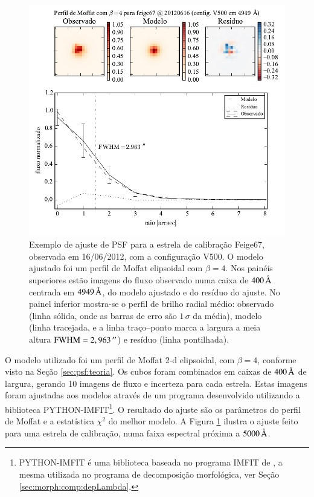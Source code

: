 \begin{figure}
	\includegraphics{figuras/PSFMoffatBeta4_exemplo}
	\caption[Exemplo de ajuste de PSF para estrela de calibração.]
	{Exemplo de ajuste de PSF para a estrela de calibração Feige67, observada em
	16/06/2012, com a configuração V500. O modelo ajustado foi um perfil de
	Moffat elipsoidal com $\beta=4$. Nos painéis superiores estão imagens do fluxo
	observado numa caixa de $400\,\text{\normalfont\AA}$ centrada em $4949\,\text{\normalfont\AA}$,
	do modelo ajustado e do resíduo do ajuste. No painel inferior mostra-se o
	perfil de brilho radial médio: observado (linha sólida, onde as barras de erro
	são $1\,\sigma$ da média), modelo (linha tracejada, e a linha traço--ponto
	marca a largura a meia altura $\mathrm{FWHM}=2,963\,^{\prime\prime}$) e resíduo (linha
	pontilhada).}
	\label{fig:PSFExemplo}
\end{figure}

O modelo utilizado foi um perfil de Moffat 2-d elipsoidal, com $\beta\!=\!4$,
conforme visto na Seção \ref{sec:psf:teoria}. Os cubos foram combinados em
caixas de $400\,\text{\normalfont\AA}$ de largura, gerando 10 imagens de fluxo e incerteza
para cada estrela. Estas imagens foram ajustadas aos modelos através de um
programa desenvolvido utilizando a biblioteca PYTHON-IMFIT\footnote{PYTHON-IMFIT
é uma biblioteca baseada no programa IMFIT de \citet{Erwin2015}, a mesma
utilizada no programa de decomposição morfológica, ver Seção
\ref{sec:morph:comp:depLambda}.}. O resultado do ajuste são os parâmetros do
perfil de Moffat e a estatística $\chi^2$ do melhor modelo. A Figura
\ref{fig:PSFExemplo} ilustra o ajuste feito para uma estrela de calibração, numa
faixa espectral próxima a $5000\,\text{\normalfont\AA}$.

